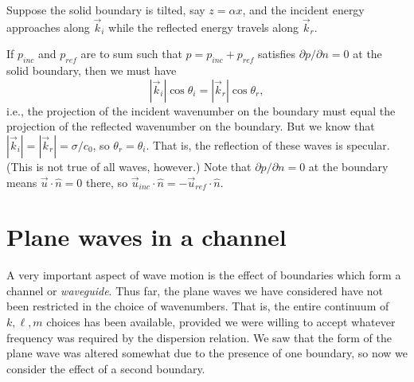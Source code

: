 Suppose the solid boundary is tilted, say $z=\alpha x$, and the incident energy
approaches along $\vec k_i$ while the reflected energy travels along $\vec k_r$.

\sourcepagebreak


If $p_{inc}$ and $p_{ref}$ are to sum such that $p=p_{inc}+p_{ref}$ satisfies
$\partial p/\partial n=0$ at the solid boundary, then we must have
\[
	|\vec k_i|\cos\theta_i=|\vec k_r|\cos\theta_r,
\]
i.e., the projection of the incident wavenumber on the boundary must equal the
projection of the reflected wavenumber on the boundary. But we know that
$|\vec k_i|=|\vec k_r|=\sigma/c_0$, so $\theta_r=\theta_i$. That is, the reflection of
these waves is specular. (This is not true of all waves, however.) Note that
$\partial p/\partial n=0$ at the boundary means $\vec u\cdot\hat n=0$ there, so
$\vec u_{inc}\cdot\hat n=-\vec u_{ref}\cdot\hat n$.

\section{Plane waves in a channel}

A very important aspect of wave motion is the effect of boundaries which form a
channel or \emph{waveguide}. Thus far, the plane waves we have considered have not been
restricted in the choice of wavenumbers. That is, the entire continuum of $k,\ell,m$
choices has been available, provided we were willing to accept whatever frequency was
required by the dispersion relation. We saw that the form of the plane wave was
altered somewhat due to the presence of one boundary, so now we consider the effect of
a second boundary.

\sourcepagebreak


